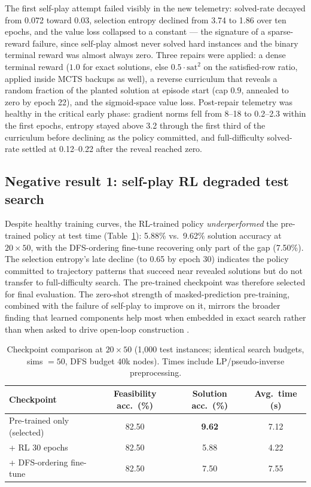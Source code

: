 \documentclass[12pt]{article}
\begin{document}
The first self-play attempt failed visibly in the new telemetry: solved-rate decayed from 0.072 toward 0.03, selection entropy declined from 3.74 to 1.86 over ten epochs, and the value loss collapsed to a constant --- the signature of a sparse-reward failure, since self-play almost never solved hard instances and the binary terminal reward was almost always zero. Three repairs were applied: a dense terminal reward ($1.0$ for exact solutions, else $0.5 \cdot \mathrm{sat}^2$ on the satisfied-row ratio, applied inside MCTS backups as well), a reverse curriculum that reveals a random fraction of the planted solution at episode start (cap $0.9$, annealed to zero by epoch 22), and the sigmoid-space value loss. Post-repair telemetry was healthy in the critical early phase: gradient norms fell from 8--18 to 0.2--2.3 within the first epochs, entropy stayed above 3.2 through the first third of the curriculum before declining as the policy committed, and full-difficulty solved-rate settled at 0.12--0.22 after the reveal reached zero.

\subsection{Negative result 1: self-play RL degraded test search}

Despite healthy training curves, the RL-trained policy \emph{underperformed} the pre-trained policy at test time (Table~\ref{tab:ckpt}): 5.88\% vs.\ 9.62\% solution accuracy at $20 \times 50$, with the DFS-ordering fine-tune recovering only part of the gap (7.50\%). The selection entropy's late decline (to 0.65 by epoch 30) indicates the policy committed to trajectory patterns that succeed near revealed solutions but do not transfer to full-difficulty search. The pre-trained checkpoint was therefore selected for final evaluation. The zero-shot strength of masked-prediction pre-training, combined with the failure of self-play to improve on it, mirrors the broader finding that learned components help most when embedded in exact search rather than when asked to drive open-loop construction \citep{gasse2019exact}.

\begin{table}[t]
\centering
\caption{Checkpoint comparison at $20 \times 50$ (1{,}000 test instances; identical search budgets, sims $=50$, DFS budget $40$k nodes). Times include LP/pseudo-inverse preprocessing.}
\label{tab:ckpt}
\begin{tabular}{lccc}
\toprule
Checkpoint & Feasibility acc.\ (\%) & Solution acc.\ (\%) & Avg.\ time (s) \\
\midrule
Pre-trained only (selected) & 82.50 & \textbf{9.62} & 7.12 \\
+ RL 30 epochs & 82.50 & 5.88 & 4.22 \\
+ DFS-ordering fine-tune & 82.50 & 7.50 & 7.55 \\
\bottomrule
\end{tabular}
\end{table}
\end{document}

